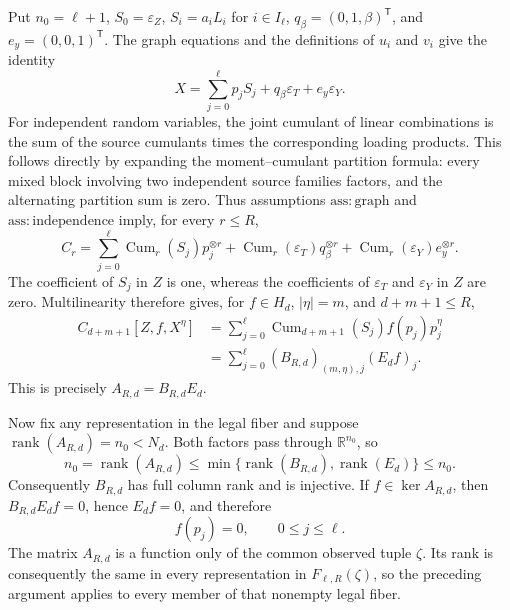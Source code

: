 Put \(n_0=\ell+1\), \(S_0=\varepsilon_Z\), \(S_i=a_iL_i\) for \(i\in I_\ell\), \(q_\beta=(0,1,\beta)^{\mathsf T}\), and \(e_y=(0,0,1)^{\mathsf T}\).  The graph equations and the definitions of \(u_i\) and \(v_i\) give the identity
\[
 X=\sum_{j=0}^{\ell}p_jS_j+q_\beta\varepsilon_T+e_y\varepsilon_Y.
\]
For independent random variables, the joint cumulant of linear combinations is the sum of the source cumulants times the corresponding loading products.  This follows directly by expanding the moment--cumulant partition formula: every mixed block involving two independent source families factors, and the alternating partition sum is zero.  Thus assumptions \(\mathrm{ass:graph}\) and \(\mathrm{ass:independence}\) imply, for every \(r\le R\),
\[
 C_r=\sum_{j=0}^{\ell}\operatorname{Cum}_r(S_j)p_j^{\otimes r}
      +\operatorname{Cum}_r(\varepsilon_T)q_\beta^{\otimes r}
      +\operatorname{Cum}_r(\varepsilon_Y)e_y^{\otimes r}.
\]
The coefficient of \(S_j\) in \(Z\) is one, whereas the coefficients of \(\varepsilon_T\) and \(\varepsilon_Y\) in \(Z\) are zero.  Multilinearity therefore gives, for \(f\in H_d\), \(|\eta|=m\), and \(d+m+1\le R\),
\[
\begin{aligned}
 C_{d+m+1}[Z,f,X^\eta]
 &=\sum_{j=0}^{\ell}
   \operatorname{Cum}_{d+m+1}(S_j)f(p_j)p_j^\eta\\
 &=\sum_{j=0}^{\ell}(B_{R,d})_{(m,\eta),j}(E_df)_j.
\end{aligned}
\]
This is precisely \(A_{R,d}=B_{R,d}E_d\).

Now fix any representation in the legal fiber and suppose \(\operatorname{rank}(A_{R,d})=n_0<N_d\).  Both factors pass through \(\mathbb R^{n_0}\), so
\[
 n_0=\operatorname{rank}(A_{R,d})
 \le \min\{\operatorname{rank}(B_{R,d}),\operatorname{rank}(E_d)\}
 \le n_0.
\]
Consequently \(B_{R,d}\) has full column rank and is injective.  If \(f\in\ker A_{R,d}\), then \(B_{R,d}E_df=0\), hence \(E_df=0\), and therefore
\[
 f(p_j)=0,\qquad 0\le j\le\ell.
\]
The matrix \(A_{R,d}\) is a function only of the common observed tuple \(\zeta\).  Its rank is consequently the same in every representation in \(F_{\ell,R}(\zeta)\), so the preceding argument applies to every member of that nonempty legal fiber.

